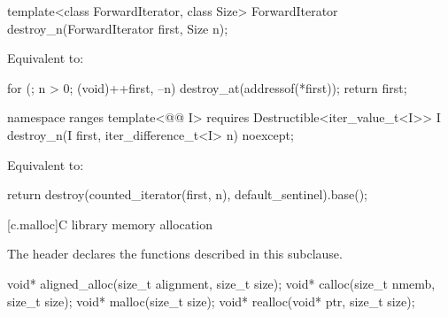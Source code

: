 %
\begin{itemdecl}
template<class ForwardIterator, class Size>
  ForwardIterator destroy_n(ForwardIterator first, Size n);
\end{itemdecl}

\begin{itemdescr}
\pnum
\effects
Equivalent to:
\begin{codeblock}
for (; n > 0; (void)++first, --n)
  destroy_at(addressof(*first));
return first;
\end{codeblock}
\end{itemdescr}

%
\begin{itemdecl}
namespace ranges {
  template<@@ I>
      requires Destructible<iter_value_t<I>>
    I destroy_n(I first, iter_difference_t<I> n) noexcept;
}
\end{itemdecl}

\begin{itemdescr}
\pnum
\effects Equivalent to:
\begin{codeblock}
return destroy(counted_iterator(first, n), default_sentinel).base();
\end{codeblock}
\end{itemdescr}

[c.malloc]{C library memory allocation}

\pnum
{}%
\begin{note}
The header 
declares the functions described in this subclause.
\end{note}

%
%
%
%
\begin{itemdecl}
void* aligned_alloc(size_t alignment, size_t size);
void* calloc(size_t nmemb, size_t size);
void* malloc(size_t size);
void* realloc(void* ptr, size_t size);
\end{itemdecl}

